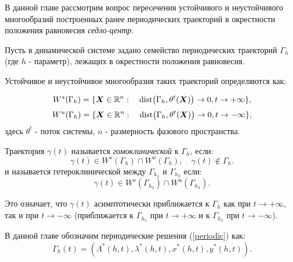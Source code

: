 В данной главе рассмотрим вопрос %
пересечения устойчивого и неустойчивого многообразий построенных ранее периодических траекторий в окрестности положения равновесия \textit{седло-центр}.

\begin{dfn}{}
Пусть в динамической системе задано семейство периодических траекторий $\Gamma_h$ (где $h$ - параметр), лежащих в окрестности положения равновесия.

Устойчивое и неустойчивое многообразия таких траекторий определяются как:

$$W^s(\Gamma_h) = \{ \boldsymbol{X} \in \mathbb{R}^n: \quad \text{dist} \big(\Gamma_h, \theta^t(\boldsymbol{X}) \big) \to 0, t \to +\infty \},$$
$$W^u(\Gamma_h) = \{ \boldsymbol{X} \in \mathbb{R}^n: \quad \text{dist} \big(\Gamma_h, \theta^t(\boldsymbol{X}) \big) \to 0, t \to -\infty \},$$
здесь $\theta^t$ - поток системы, $n$ - размерность фазового пространства.

Траектория $\gamma(t)$ называется \emph{гомоклинической} к $\Gamma_h$, если:
\[
\gamma(t) \in W^s(\Gamma_h) \cap W^u(\Gamma_h), \quad \gamma(t) \notin \Gamma_h.
\]
и называется гетероклинической между $\Gamma_{h_1}$ и $\Gamma_{h_2}$ если:
\[
\gamma(t) \in W^s(\Gamma_{h_2}) \cap W^u(\Gamma_{h_2}).
\]

Это означает, что $\gamma(t)$ асимптотически приближается к $\Gamma_h$ как при $t \to +\infty$, так и при $t \to -\infty$ (приближается к $\Gamma_{h_1}$ при $t \to +\infty$ и к $\Gamma_{h_2}$ при $t \to -\infty$).
\end{dfn}

В данной главе обозначим периодические решения (\ref{periodic}) как: 
$$\Gamma_h(t)=(\Lambda^*(h,t),\lambda^*(h,t),x^*(h,t),y^*(h,t)).$$

